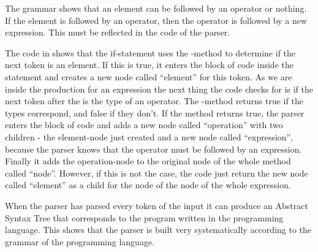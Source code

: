 \begin{ebnf}
\end{ebnf}

The grammar shows that an element can be followed by an operator or nothing. If the element is followed by an operator, then the operator is followed by a new expression. This must be reflected in the code of the parser.



The code in  shows that the if-statement uses the -method to determine if the next token is an element. If this is true, it enters the block of code inside the statement and creates a new node called ``element'' for this token. As we are inside the production for an expression the next thing the code checks for is if the next token after the  is the type of an operator. The -method returns true if the types correspond, and false if they don't. If the method returns true, the parser enters the block of code and adds a new node called ``operation'' with two children - the element-node just created and a new node called ``expression'', because the parser knows that the operator must be followed by an expression. Finally it adds the operation-node to the original node of the whole method called ``node''.
However, if this is not the case, the code just return the new node called ``element'' as a child for the node of the node of the whole expression. 

When the parser has parsed every token of the input it can produce an Abstract Syntax Tree that corresponds to the program written in the programming language. This shows that the parser is built very systematically according to the grammar of the programming language.